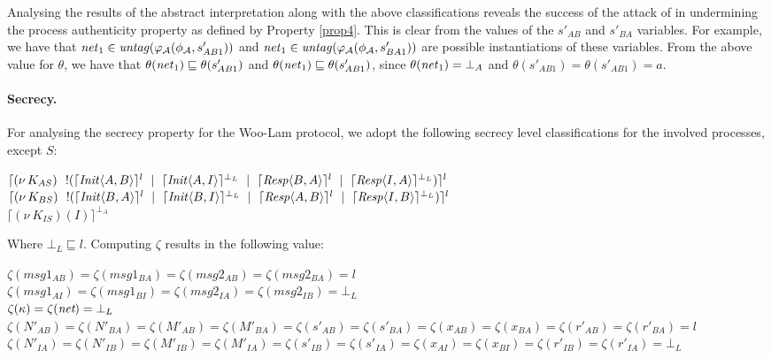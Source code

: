 \documentclass[10pt,a4paper,final,oneside,fleqn]{book}
\begin{document}
\noindent
Analysing the results of the abstract interpretation along with the above classifications reveals the success of the attack of \cite{abadi5} in undermining the process authenticity property as defined by Property \ref{prop4}. This is clear from the values of the $s'_{AB}$ and $s'_{BA}$ variables.  For example, we have that $\mbox{{\itshape net\/}}_1\in\mbox{{\itshape untag\/}}(\varphi_\mathcal{A}(\phi_\mathcal{A},s'_{AB1}))$ and $\mbox{{\itshape net\/}}_1\in\mbox{{\itshape untag\/}}(\varphi_\mathcal{A}(\phi_\mathcal{A},s'_{BA1}))$ are possible instantiations of these variables. From the above value for $\theta$, we have that $\theta(\mbox{{\itshape net\/}}_1)\sqsubseteq\theta(s'_{AB1})$ and $\theta(\mbox{{\itshape net\/}}_1)\sqsubseteq\theta(s'_{AB1})$, since $\theta(\mbox{{\itshape net\/}}_1)=\bot_A$ and $\theta(s'_{AB1})=\theta(s'_{AB1})=a$.

\paragraph{Secrecy.} For analysing the secrecy property for the Woo-Lam protocol, we adopt the following secrecy level classifications for the involved processes, except $S$:\vspace{6mm}

\noindent
$\lceil (\nu~\!K_{AS})~~!(\lceil \mbox{{\itshape Init\/}}\langle A,B\rangle\rceil^l~\mid~\lceil \mbox{{\itshape Init\/}}\langle A,I\rangle\rceil^{\bot_L}~\mid~\lceil \mbox{{\itshape Resp\/}}\langle B,A\rangle\rceil^{l}~\mid~\lceil \mbox{{\itshape Resp\/}}\langle I,A\rangle\rceil^{\bot_L})\rceil^l$\\
$\lceil (\nu~\!K_{BS})~~!(\lceil \mbox{{\itshape Init\/}}\langle B,A\rangle\rceil^l~\mid~\lceil \mbox{{\itshape Init\/}}\langle B,I\rangle\rceil^{\bot_L}~\mid~\lceil \mbox{{\itshape Resp\/}}\langle A,B\rangle\rceil^l~\mid~\lceil \mbox{{\itshape Resp\/}}\langle I,B\rangle\rceil^{\bot_L})\rceil^l$\\
$\lceil (\nu~\!K_{IS})(I)\rceil^{\bot_A}$\vspace{6mm}

\noindent
Where $\bot_L\sqsubseteq l$. Computing $\zeta$ results in the following value:\vspace{6mm}


\noindent $\zeta(msg1_{AB})=\zeta(msg1_{BA})=\zeta(msg2_{AB})=\zeta(msg2_{BA})=l$\\
$\zeta(msg1_{AI})=\zeta(msg1_{BI})=\zeta(msg2_{IA})=\zeta(msg2_{IB})=\bot_L$\\
$\zeta(\kappa)=\zeta(\mbox{{\itshape net}})=\bot_L$\\
$\zeta(N'_{AB})=\zeta(N'_{BA})=\zeta(M'_{AB})=\zeta(M'_{BA})=\zeta(s'_{AB})=\zeta(s'_{BA})=\zeta(x_{AB})=\zeta(x_{BA})=\zeta(r'_{AB})=\zeta(r'_{BA})=l$\\
$\zeta(N'_{IA})=\zeta(N'_{IB})=\zeta(M'_{IB})=\zeta(M'_{IA})=\zeta(s'_{IB})=\zeta(s'_{IA})=\zeta(x_{AI})=\zeta(x_{BI})=\zeta(r'_{IB})=\zeta(r'_{IA})=\bot_L$\vspace{6mm}
\end{document}
